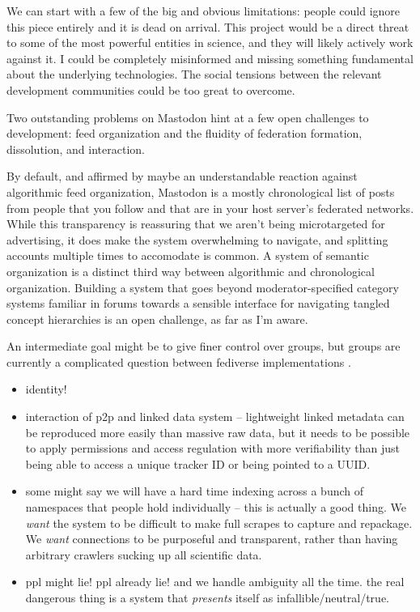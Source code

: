 \documentclass[10pt]{article}
\begin{document}
\begin{multicols}{2}
 We can start with a few of the big and obvious
limitations: people could ignore this piece entirely and it is dead on
arrival. This project would be a direct threat to some of the most
powerful entities in science, and they will likely actively work against
it. I could be completely misinformed and missing something fundamental
about the underlying technologies. The social tensions between the
relevant development communities could be too great to overcome.

Two outstanding problems on Mastodon hint at a few open challenges to
development: feed organization and the fluidity of federation formation,
dissolution, and interaction.

By default, and affirmed by maybe an understandable reaction against
algorithmic feed organization, Mastodon is a mostly chronological list
of posts from people that you follow and that are in your host server's
federated networks. While this transparency is reassuring that we aren't
being microtargeted for advertising, it does make the system
overwhelming to navigate, and splitting accounts multiple times to
accomodate is common. A system of semantic organization is a distinct
third way between algorithmic and chronological organization. Building a
system that goes beyond moderator-specified category systems familiar in
forums towards a sensible interface for navigating tangled concept
hierarchies is an open challenge, as far as I'm aware.

An intermediate goal might be to give finer control over groups, but
groups are currently a complicated question between fediverse
implementations \cite{StandardizingActivityPubGroups2021} .

\begin{itemize}

\item
  identity!
\item
  interaction of p2p and linked data system -- lightweight linked
  metadata can be reproduced more easily than massive raw data, but it
  needs to be possible to apply permissions and access regulation with
  more verifiability than just being able to access a unique tracker ID
  or being pointed to a UUID.
\item
  some might say we will have a hard time indexing across a bunch of
  namespaces that people hold individually -- this is actually a good
  thing. We \emph{want} the system to be difficult to make full scrapes
  to capture and repackage. We \emph{want} connections to be purposeful
  and transparent, rather than having arbitrary crawlers sucking up all
  scientific data.
\item
  ppl might lie! ppl already lie! and we handle ambiguity all the time.
  the real dangerous thing is a system that \emph{presents} itself as
  infallible/neutral/true.
\end{itemize}


\end{multicols}
\end{document}
